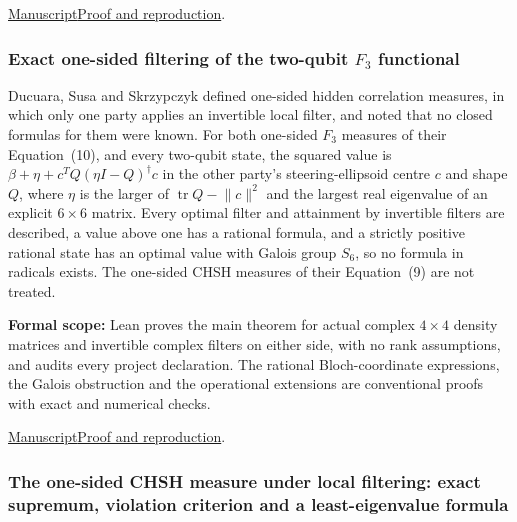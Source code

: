 \documentclass[11pt,a4paper]{article}
\begin{document}
\href{https://github.com/dvgyl/math-and-theory/blob/main/papers/physics/steering-joint-range/manuscript.pdf}{Manuscript}\quad\href{https://github.com/dvgyl/math-and-theory/blob/main/papers/physics/steering-joint-range/README.md}{Proof and reproduction}.

\subsubsection{Exact one-sided filtering of the two-qubit $F_3$ functional}

Ducuara, Susa and Skrzypczyk defined one-sided hidden correlation measures, in which only one party applies an invertible local filter, and noted that no closed formulas for them were known. For both one-sided $F_3$ measures of their Equation~(10), and every two-qubit state, the squared value is $\beta+\eta+c^TQ(\eta I-Q)^\dagger c$ in the other party's steering-ellipsoid centre $c$ and shape $Q$, where $\eta$ is the larger of $\operatorname{tr}Q-\lVert c\rVert^2$ and the largest real eigenvalue of an explicit $6\times6$ matrix. Every optimal filter and attainment by invertible filters are described, a value above one has a rational formula, and a strictly positive rational state has an optimal value with Galois group $S_6$, so no formula in radicals exists. The one-sided CHSH measures of their Equation~(9) are not treated.

\noindent\textbf{Formal scope:} Lean proves the main theorem for actual complex $4\times4$ density matrices and invertible complex filters on either side, with no rank assumptions, and audits every project declaration. The rational Bloch-coordinate expressions, the Galois obstruction and the operational extensions are conventional proofs with exact and numerical checks.

\href{https://github.com/dvgyl/math-and-theory/blob/main/papers/physics/one-sided-f3/manuscript.pdf}{Manuscript}\quad\href{https://github.com/dvgyl/math-and-theory/blob/main/papers/physics/one-sided-f3/README.md}{Proof and reproduction}.

\subsubsection{The one-sided CHSH measure under local filtering: exact supremum, violation criterion and a least-eigenvalue formula}
\end{document}
